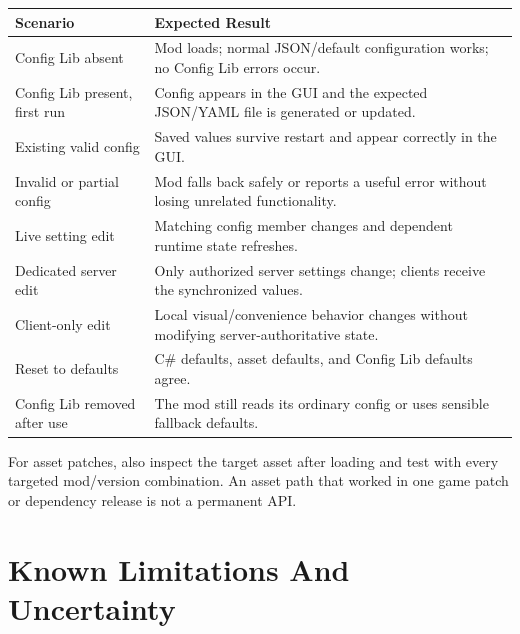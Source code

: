 \documentclass[
  11pt,
  letterpaper,
  titlepage]{article}
\newcounter{none} %
\begin{document}
{\def\LTcaptype{none} %
\begin{longtable}[]{@{}
  >{\raggedright\arraybackslash}p{}
  >{\raggedright\arraybackslash}p{}@{}}
\toprule\noalign{}
\begin{minipage}[b]{\linewidth}\raggedright
Scenario
\end{minipage} & \begin{minipage}[b]{\linewidth}\raggedright
Expected Result
\end{minipage} \\
\midrule\noalign{}
\endhead
\bottomrule\noalign{}
\endlastfoot
Config Lib absent & Mod loads; normal JSON/default configuration works;
no Config Lib errors occur. \\
Config Lib present, first run & Config appears in the GUI and the
expected JSON/YAML file is generated or updated. \\
Existing valid config & Saved values survive restart and appear
correctly in the GUI. \\
Invalid or partial config & Mod falls back safely or reports a useful
error without losing unrelated functionality. \\
Live setting edit & Matching config member changes and dependent runtime
state refreshes. \\
Dedicated server edit & Only authorized server settings change; clients
receive the synchronized values. \\
Client-only edit & Local visual/convenience behavior changes without
modifying server-authoritative state. \\
Reset to defaults & C\# defaults, asset defaults, and Config Lib
defaults agree. \\
Config Lib removed after use & The mod still reads its ordinary config
or uses sensible fallback defaults. \\
\end{longtable}
}

For asset patches, also inspect the target asset after loading and test
with every targeted mod/version combination. An asset path that worked
in one game patch or dependency release is not a permanent API.

\section{Known Limitations And
Uncertainty}\label{known-limitations-and-uncertainty}
\end{document}

